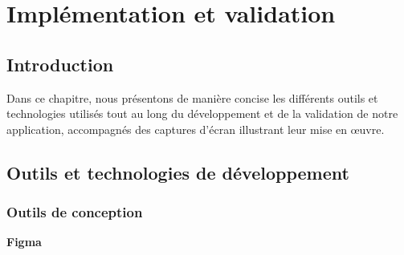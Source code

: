




\chapter{Implémentation et validation}
\pagestyle{chapterstyle}


\newpage
\vspace{1cm}

\section{Introduction}
Dans ce chapitre, nous présentons de manière concise les différents 
outils et technologies utilisés tout au long du développement et de la validation de notre 
application, accompagnés des captures d'écran illustrant leur mise en œuvre.



\section{Outils et technologies de développement}
\subsection{Outils de conception}

\large 
\textbf{Figma}

